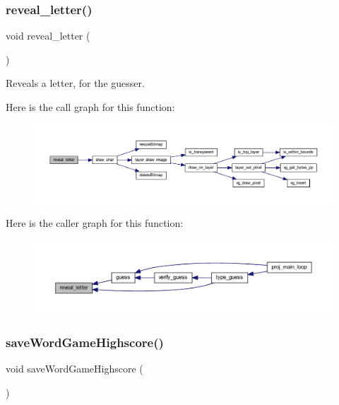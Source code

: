 \subsubsection{\texorpdfstring{reveal\+\_\+letter()}{reveal\_letter()}}
{\footnotesize\ttfamily void reveal\+\_\+letter (\begin{DoxyParamCaption}{ }\end{DoxyParamCaption})}



Reveals a letter, for the guesser. 

Here is the call graph for this function\+:\nopagebreak
\begin{figure}[H]
\begin{center}
\leavevmode
\includegraphics[width=350pt]{group__wordpicker_gaed4201a80c5cb2936c795fa51d9f0841_cgraph}
\end{center}
\end{figure}
Here is the caller graph for this function\+:\nopagebreak
\begin{figure}[H]
\begin{center}
\leavevmode
\includegraphics[width=350pt]{group__wordpicker_gaed4201a80c5cb2936c795fa51d9f0841_icgraph}
\end{center}
\end{figure}
\mbox{\label{group__wordpicker_gaaa45a5f1ebd34efbf6b74088634083bc}} 
\subsubsection{\texorpdfstring{save\+Word\+Game\+Highscore()}{saveWordGameHighscore()}}
{\footnotesize\ttfamily void save\+Word\+Game\+Highscore (\begin{DoxyParamCaption}{ }\end{DoxyParamCaption})}



